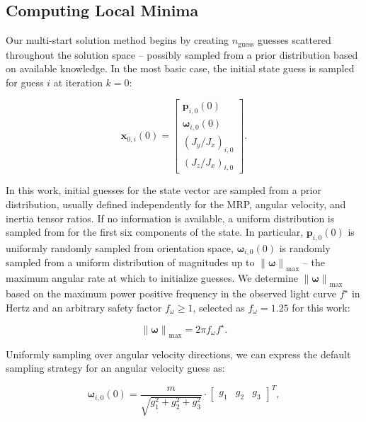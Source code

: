 \documentclass[a4paper,twocolumn]{spaceDebrisC} %
\newcommand{\vctr}[1]{\bm{#1}}
\newcommand{\norm}[1]{\left\lVert#1\right\rVert}
\begin{document}
\subsection{Computing Local Minima} \label{sec:run_solver}

Our multi-start solution method begins by creating $n_\text{guess}$ guesses scattered throughout the solution space -- possibly sampled from a prior distribution based on available knowledge. In the most basic case, the initial state guess is sampled for guess $i$ at iteration $k=0$:

\begin{equation}
 \vctr{x}_{0,i}(0) = \begin{bmatrix}\vctr{p}_{i,0}(0) \\ \vctr{\omega}_{i,0}(0) \\ \left(J_y / J_x\right)_{i,0} \\ \left(J_z / J_x\right)_{i,0}\end{bmatrix}.
\end{equation}

In this work, initial guesses for the state vector are sampled from a prior distribution, usually defined independently for the MRP, angular velocity, and inertia tensor ratios. If no information is available, a uniform distribution is sampled from for the first six components of the state. In particular, $\vctr{p}_{i,0}(0)$ is uniformly randomly sampled from orientation space, $\vctr{\omega}_{i,0}(0)$ is randomly sampled from a uniform distribution of magnitudes up to $\norm{\vctr{\omega}}_\text{max}$ -- the maximum angular rate at which to initialize guesses. We determine $\norm{\vctr{\omega}}_\text{max}$ based on the maximum power positive frequency in the observed light curve $f^\star$ in Hertz and an arbitrary safety factor $f_\omega \geq 1$, selected as $f_\omega = 1.25$ for this work:

\begin{equation} \label{eq:ang_vel_max}
  \norm{\vctr{\omega}}_\text{max} = 2\pi f_\omega f^\star.
\end{equation}

Uniformly sampling over angular velocity directions, we can express the default sampling strategy for an angular velocity guess as:

\begin{equation} \label{eq:omega_sampler}
  \vctr{\omega}_{i,0}(0) = \frac{m}{\sqrt{g_1^2+g_2^2+g_3^2}} \cdot \begin{bmatrix} g_1 & g_2 & g_3 \end{bmatrix}^T,
\end{equation}
\end{document}
